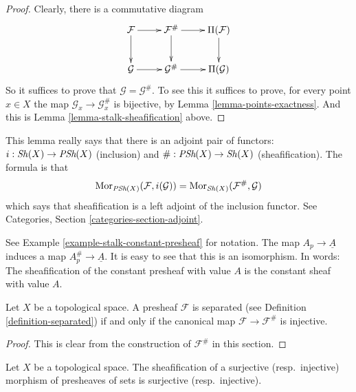 \begin{proof}
Clearly, there is a commutative diagram
$$
\xymatrix{
\mathcal{F} \ar[r] \ar[d] &
\mathcal{F}^\# \ar[r] \ar[d] &
\Pi(\mathcal{F}) \ar[d] \\
\mathcal{G} \ar[r] &
\mathcal{G}^\# \ar[r] &
\Pi(\mathcal{G}) \\
}
$$
So it suffices to prove that $\mathcal{G} = \mathcal{G}^\#$.
To see this it suffices to prove, for every point $x \in X$ the
map $\mathcal{G}_x \to \mathcal{G}^\#_x$ is bijective, by
Lemma \ref{lemma-points-exactness}. And this is
Lemma \ref{lemma-stalk-sheafification} above.
\end{proof}

\noindent
This lemma really says that there is an adjoint pair
of functors: $i : \mathop{\mathit{Sh}}\nolimits(X) \to \textit{PSh}(X)$
(inclusion) and $\# : \textit{PSh}(X) \to \mathop{\mathit{Sh}}\nolimits(X)$
(sheafification). The formula is that
$$
\mathop{\mathrm{Mor}}\nolimits_{\textit{PSh}(X)}(\mathcal{F}, i(\mathcal{G}))
=
\mathop{\mathrm{Mor}}\nolimits_{\mathop{\mathit{Sh}}\nolimits(X)}(\mathcal{F}^\#, \mathcal{G})
$$
which says that sheafification is a left adjoint of
the inclusion functor. See Categories, Section
\ref{categories-section-adjoint}.

\begin{example}
\label{example-sheafify-constant}
See Example \ref{example-stalk-constant-presheaf} for notation.
The map $A_p \to \underline{A}$ induces a map
$A_p^\# \to \underline{A}$. It is easy to see that this
is an isomorphism. In words: The sheafification
of the constant presheaf with value $A$ is the
constant sheaf with value $A$.
\end{example}

\begin{lemma}
\label{lemma-separated-presheaf-into-sheaf}
Let $X$ be a topological space.
A presheaf $\mathcal{F}$ is separated (see
Definition \ref{definition-separated}) if and only if
the canonical map $\mathcal{F} \to \mathcal{F}^\#$ is injective.
\end{lemma}

\begin{proof}
This is clear from the construction of $\mathcal{F}^\#$ in this
section.
\end{proof}

\begin{lemma}
\label{lemma-sheafify-epi-mono}
Let $X$ be a topological space. The sheafification of a surjective
(resp.\ injective) morphism of presheaves of sets is surjective
(resp.\ injective).
\end{lemma}

